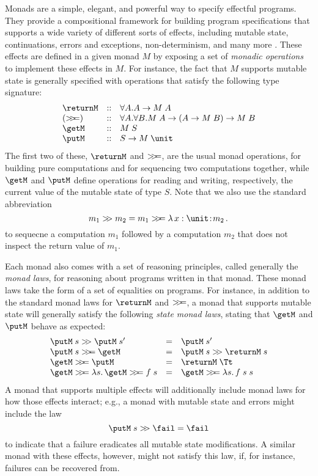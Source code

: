 \documentclass[preprint]{sigplanconf}
\begin{document}
Monads are a simple, elegant, and powerful way to specify effectful programs.
They provide a compositional framework for building program specifications that
supports a wide variety of different sorts of effects, including mutable state,
continuations, errors and exceptions, non-determinism, and many more
\cite{moggi91}.  These effects are defined in a given monad $M$ by exposing a
set of \emph{monadic operations} to implement these effects in $M$. For
instance, the fact that $M$ supports mutable state is generally specified with
operations that satisfy the following type signature:
\[
\begin{array}{lcl}
  \returnM & :: & \forall A. A \to M\;A \\
  (\bind) & :: & \forall A. \forall B. M\;A \to (A\to M\;B) \to M\;B \\
  \getM & :: & M\;S \\
  \putM & :: & S \to M\;\unit
\end{array}
\]
The first two of these, $\returnM$ and $>\!\!>\!\!=$, are the usual monad operations,
for building pure computations and for sequencing two computations together,
while $\getM$ and $\putM$ define operations for reading and writing,
respectively, the current value of the mutable state of type $S$. Note that
we also use the standard abbreviation
\[
m_1 \bindU m_2 = m_1 \bind \lamabs{x:\unit}{m_2}
\]
to sequecne a computation $m_1$ followed by a computation $m_2$ that does not
inspect the return value of $m_1$.


Each monad also comes with a set of reasoning principles, called generally the
\emph{monad laws}, for reasoning about programs written in that monad. These
monad laws take the form of a set of equalities on programs. For instance, in
addition to the standard monad laws for $\returnM$ and $>\!\!>\!\!=$, a monad that
supports mutable state will generally satisfy the following \emph{state monad
  laws}, stating that $\getM$ and $\putM$ behave as expected:
\[
\begin{array}{lcl}
  \putM\;s \bindU \putM\;s' & = & \putM\;s'\\
  \putM\;s \bind \getM & = & \putM\;s \bindU \returnM\;s \\
  \getM\bind\putM & = & \returnM\;\Tt \\
  \getM\bind \lamabsnot{s}{\getM\bind f\;s} & = & \getM\bind\lamabsnot{s}{f\;s\;s}
\end{array}
\]
A monad that supports multiple effects will additionally include monad laws for
how those effects interact; e.g., a monad with mutable state and errors might
include the law
\[
\putM\;s \bindU \fail = \fail
\]
to indicate that a failure eradicates all mutable state modifications.  A
similar monad with these effects, however, might not satisfy this law, if, for
instance, failures can be recovered from.
\end{document}

